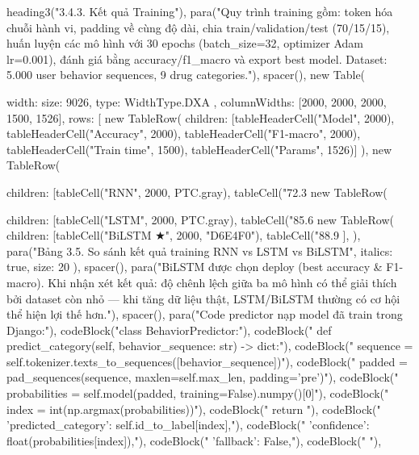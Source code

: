   heading3("3.4.3. Kết quả Training"),
  para("Quy trình training gồm: token hóa chuỗi hành vi, padding về cùng độ dài, chia train/validation/test (70/15/15), huấn luyện các mô hình với 30 epochs (batch_size=32, optimizer Adam lr=0.001), đánh giá bằng accuracy/f1_macro và export best model. Dataset: 5.000 user behavior sequences, 9 drug categories."),
  spacer(),
  new Table({
    width: { size: 9026, type: WidthType.DXA },
    columnWidths: [2000, 2000, 2000, 1500, 1526],
    rows: [
      new TableRow({ children: [tableHeaderCell("Model", 2000), tableHeaderCell("Accuracy", 2000), tableHeaderCell("F1-macro", 2000), tableHeaderCell("Train time", 1500), tableHeaderCell("Params", 1526)] }),
      new TableRow({ children: [tableCell("RNN", 2000, PTC.gray), tableCell("72.3%
      new TableRow({ children: [tableCell("LSTM", 2000, PTC.gray), tableCell("85.6%
      new TableRow({ children: [tableCell("BiLSTM ★", 2000, "D6E4F0"), tableCell("88.9%
    ],
  }),
  para("Bảng 3.5. So sánh kết quả training RNN vs LSTM vs BiLSTM", { italics: true, size: 20 }),
  spacer(),
  para("BiLSTM được chọn deploy (best accuracy & F1-macro). Khi nhận xét kết quả: độ chênh lệch giữa ba mô hình có thể giải thích bởi dataset còn nhỏ — khi tăng dữ liệu thật, LSTM/BiLSTM thường có cơ hội thể hiện lợi thế hơn."),
  spacer(),
  para("Code predictor nạp model đã train trong Django:"),
  codeBlock("class BehaviorPredictor:"),
  codeBlock("    def predict_category(self, behavior_sequence: str) -> dict:"),
  codeBlock("        sequence = self.tokenizer.texts_to_sequences([behavior_sequence])"),
  codeBlock("        padded = pad_sequences(sequence, maxlen=self.max_len, padding='pre')"),
  codeBlock("        probabilities = self.model(padded, training=False).numpy()[0]"),
  codeBlock("        index = int(np.argmax(probabilities))"),
  codeBlock("        return {"),
  codeBlock("            'predicted_category': self.id_to_label[index],"),
  codeBlock("            'confidence': float(probabilities[index]),"),
  codeBlock("            'fallback': False,"),
  codeBlock("        }"),

}}}
